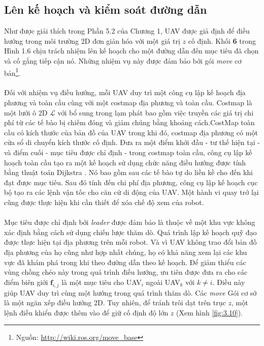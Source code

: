 \documentclass[11pt,openany]{book}
\begin{document}
\subsection{Lên kế hoạch và kiểm soát đường dẫn}
Như được giải thích trong Phần 5.2 của Chương 1, UAV được giả định để điều hướng trong môi trường 2D đơn giản hóa với một giá trị $z$ cố định. Khối \textbf{6} trong Hình 1.6 chịu trách nhiệm lên kế hoạch cho một đường dẫn đến mục tiêu đã chọn và cố gắng tiếp cận nó. Những nhiệm vụ này được đảm bảo bởi gói \textit{move} cơ bản\footnote{Nguồn: \url{http://wiki.ros.org/move_base}}.\\\\
Đối với nhiệm vụ điều hướng, mỗi UAV duy trì một công cụ lập kế hoạch địa phương và toàn cầu cùng với một costmap địa phương và toàn cầu. Costmap là một lưới ô 2D $\mathcal{L}$ với bổ sung trong lạm phát bao gồm việc truyền các giá trị chi phí từ các tế bào bị chiếm đóng và giảm chúng bằng khoảng cách.CostMap toàn cầu có kích thước của bản đồ của UAV trong khi đó, costmap địa phương có một cửa sổ di chuyển kích thước cố định. Đưa ra một điểm khởi đầu - tư thế hiện tại - và điểm cuối - mục tiêu được chỉ định - trong costmap toàn cầu, công cụ lập kế hoạch toàn cầu tạo ra một kế hoạch sử dụng chức năng điều hướng được tính bằng thuật toán Dijkstra \cite{dijkstra1959note}. Nó bao gồm sau các tế bào tự do liền kề cho đến khi đạt được mục tiêu. Sau đó tính đến chi phí địa phương, công cụ lập kế hoạch cục bộ tạo ra các lệnh vận tốc cho căn cứ di động của UAV. Một hành vi quay trở lại cũng được thực hiện khi cần thiết để xóa chế độ xem của robot.\\\\
Mục tiêu được chỉ định bởi \textit{leader} được đảm bảo là thuộc về một khu vực không xác định bằng cách sử dụng chiến lược thăm dò. Quá trình lập kế hoạch quỹ đạo được thực hiện tại địa phương trên mỗi robot. Và vì UAV không trao đổi bản đồ địa phương của họ cũng như hợp nhất chúng, họ có khả năng xem lại các khu vực đã khám phá trong khi theo đường dẫn theo kế hoạch. Để giảm thiểu các vùng chồng chéo này trong quá trình điều hướng, ưu tiên được đưa ra cho các điểm biên giới $\mathbf{f}_{i,j}$ là một mục tiêu cho UAV$_i$ ngoài UAV$_k$ với $k \neq i$. Điều này giúp UAV duy trì cùng một hướng trong quá trình thăm dò. Các \textit{move} Gói cơ sở là một ngăn xếp điều hướng 2D. Tuy nhiên, để tránh trôi dạt trên trục $z$, một lệnh điều khiển được thêm vào để giữ cố định độ lớn $z$ (Xem hình \ref{fig:3.10}).
\end{document}
